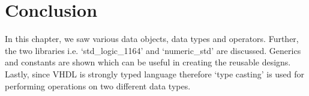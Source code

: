 \section{Conclusion}
In this chapter, we saw various data objects, data types and operators. Further, the two libraries i.e. `std\_logic\_1164' and `numeric\_std' are discussed. Generics and constants are shown which can be useful in creating the reusable designs. Lastly, since VHDL is strongly typed language therefore `type casting' is used for performing operations on two different data types. 